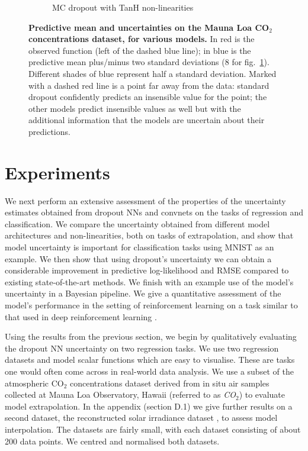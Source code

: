 \documentclass{article}
\theoremstyle{definition}
\begin{document}
\begin{figure}[t!]
\begin{subfigure}[b]{0.5\textwidth}
		\vspace{-5mm}
		\caption{MC dropout with TanH non-linearities} \label{fig:extra_MC_TANH}
	\end{subfigure}
	\vspace{-6mm}
	\caption{\textbf{Predictive mean and uncertainties on the Mauna Loa CO$_2$ concentrations dataset, for various models.} In red is the observed function (left of the dashed blue line); in blue is the predictive mean plus/minus two standard deviations (8 for fig.\ \ref{fig:extra_MC_TANH}). Different shades of blue represent half a standard deviation. Marked with a dashed red line is a point far away from the data: standard dropout confidently predicts an insensible value for the point; the other models predict insensible values as well but with the additional information that the models are uncertain about their predictions.} \label{fig:extra}
	\vspace{-5mm}
\end{figure}

\section{Experiments}

We next perform an extensive assessment of the properties of the uncertainty estimates obtained from dropout NNs and convnets on the tasks of regression and classification. We compare the uncertainty obtained from different model architectures and non-linearities, both on tasks of extrapolation, and show that model uncertainty is important for classification tasks using MNIST \citep{lecun1998mnist} as an example. 
We then show that using dropout's uncertainty we can obtain a considerable improvement in predictive log-likelihood and RMSE compared to existing state-of-the-art methods.
We finish with an example use of the model's uncertainty in a Bayesian pipeline. We give a quantitative assessment of the model's performance in the setting of reinforcement learning on a task similar to that used in deep reinforcement learning \citep{mnih2015human}.

Using the results from the previous section, we begin by qualitatively evaluating the dropout NN uncertainty on two regression tasks. We use two regression datasets and model scalar functions which are easy to visualise. These are tasks one would often come across in real-world data analysis. We use a subset of the atmospheric CO$_2$ concentrations dataset derived from in situ air samples collected at Mauna Loa Observatory, Hawaii \citep{Keeling2004} (referred to as \textit{CO$_2$}) to evaluate model extrapolation. In the appendix (section D.1) we give further results on a second dataset, the reconstructed solar irradiance dataset \citep{Lean2004}, to assess model interpolation. The datasets are fairly small, with each dataset consisting of about 200 data points. We centred and normalised both datasets.
\end{document}
